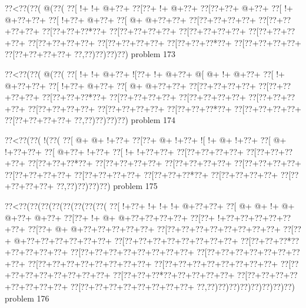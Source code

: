 \vbox{\vbox{\goo
\0??<\0??(\0??(\- @(\0??(
\0??[\- !+\- !+\- @+\0??+
\0??[\0??+\- !+\- @+\0??+
\0??[\0??+\0??+\- @+\0??+
\0??[\- !+\- @+\0??+\0??+
\0??[\- !+\0??+\- @+\0??+
\0??[\- @+\- @+\0??+\0??+
\0??[\0??+\0??+\0??+\0??+
\0??[\0??+\0??+\0??+\0??+
\0??[\0??+\0??+\0??*\0??+
\0??[\0??+\0??+\0??+\0??+
\0??[\0??+\0??+\0??+\0??+
\0??[\0??+\0??+\0??+\0??+
\0??[\0??+\0??+\0??+\0??+
\0??[\0??+\0??+\0??+\0??+
\0??[\0??+\0??+\0??*\0??+
\0??[\0??+\0??+\0??+\0??+
\0??[\0??+\0??+\0??+\0??+
\0??,\0??)\0??)\0??)\0??)
}
\hfil problem 173\hfil\break
}

\vbox{\vbox{\goo
\0??<\0??(\0??(\- @(\0??(
\0??[\- !+\- !+\- @+\0??+
\- ![\0??+\- !+\- @+\0??+
\- @[\- @+\- !+\- @+\0??+
\0??[\- !+\- @+\0??+\0??+
\0??[\- !+\0??+\- @+\0??+
\0??[\- @+\- @+\0??+\0??+
\0??[\0??+\0??+\0??+\0??+
\0??[\0??+\0??+\0??+\0??+
\0??[\0??+\0??+\0??*\0??+
\0??[\0??+\0??+\0??+\0??+
\0??[\0??+\0??+\0??+\0??+
\0??[\0??+\0??+\0??+\0??+
\0??[\0??+\0??+\0??+\0??+
\0??[\0??+\0??+\0??+\0??+
\0??[\0??+\0??+\0??*\0??+
\0??[\0??+\0??+\0??+\0??+
\0??[\0??+\0??+\0??+\0??+
\0??,\0??)\0??)\0??)\0??)
}
\hfil problem 174\hfil\break
}

\vbox{\vbox{\goo
\0??<\0??(\0??(\- !(\0??(
\0??[\- @+\- @+\- !+\0??+
\0??[\0??+\- @+\- !+\0??+
\- ![\- !+\- @+\- !+\0??+
\0??[\- @+\- !+\0??+\0??+
\0??[\- @+\0??+\- !+\0??+
\0??[\- !+\- !+\0??+\0??+
\0??[\0??+\0??+\0??+\0??+
\0??[\0??+\0??+\0??+\0??+
\0??[\0??+\0??+\0??*\0??+
\0??[\0??+\0??+\0??+\0??+
\0??[\0??+\0??+\0??+\0??+
\0??[\0??+\0??+\0??+\0??+
\0??[\0??+\0??+\0??+\0??+
\0??[\0??+\0??+\0??+\0??+
\0??[\0??+\0??+\0??*\0??+
\0??[\0??+\0??+\0??+\0??+
\0??[\0??+\0??+\0??+\0??+
\0??,\0??)\0??)\0??)\0??)
}
\hfil problem 175\hfil\break
}

\vbox{\vbox{\goo
\0??<\0??(\0??(\0??(\0??(\0??(\0??(\0??(\0??(
\0??[\- !+\0??+\- !+\- !+\- !+\- @+\0??+\0??+
\0??[\- @+\- @+\- !+\- @+\- @+\0??+\- @+\0??+
\0??[\0??+\- !+\- @+\- @+\0??+\0??+\0??+\0??+
\0??[\0??+\- !+\0??+\0??+\0??+\0??+\0??+\0??+
\0??[\0??+\- @+\- @+\0??+\0??+\0??+\0??+\0??+
\0??[\0??+\0??+\0??+\0??+\0??+\0??+\0??+\0??+
\0??[\0??+\- @+\0??+\0??+\0??+\0??+\0??+\0??+
\0??[\0??+\0??+\0??+\0??+\0??+\0??+\0??+\0??+
\0??[\0??+\0??+\0??*\0??+\0??+\0??+\0??+\0??+
\0??[\0??+\0??+\0??+\0??+\0??+\0??+\0??+\0??+
\0??[\0??+\0??+\0??+\0??+\0??+\0??+\0??+\0??+
\0??[\0??+\0??+\0??+\0??+\0??+\0??+\0??+\0??+
\0??[\0??+\0??+\0??+\0??+\0??+\0??+\0??+\0??+
\0??[\0??+\0??+\0??+\0??+\0??+\0??+\0??+\0??+
\0??[\0??+\0??+\0??*\0??+\0??+\0??+\0??+\0??+
\0??[\0??+\0??+\0??+\0??+\0??+\0??+\0??+\0??+
\0??[\0??+\0??+\0??+\0??+\0??+\0??+\0??+\0??+
\0??,\0??)\0??)\0??)\0??)\0??)\0??)\0??)\0??)
}
\hfil problem 176\hfil\break
}

